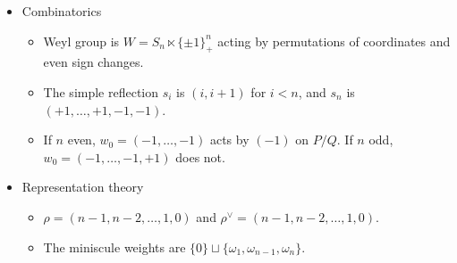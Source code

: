 \documentclass{article}
\begin{document}
\begin{itemize}
\begin{itemize}
		\item The simple roots are $\{e_i-e_{i+1}:i\}\cup\{e_{n-1}+e_n\}$. Set $\alpha_i\coloneqq e_i-e_{i+1}$ and $\alpha_n\coloneqq e_{n-1}+e_n$.
		\item Dynkin diagram:
		\[\begin{tikzcd}[cramped, row sep=tiny]
			&&&& {\alpha_{n-1}} \\
			{\alpha_1} & {\alpha_2} & \cdots & {\alpha_{n-2}} \\
			&&&& {\alpha_n}
			\arrow[no head, from=2-1, to=2-2]
			\arrow[no head, from=2-2, to=2-3]
			\arrow[no head, from=2-3, to=2-4]
			\arrow[no head, from=2-4, to=1-5]
			\arrow[no head, from=2-4, to=3-5]
		\end{tikzcd}\]
		\item The fundamental weights are $\{\omega_i\}_i$ where $\omega_i\coloneqq({1,\ldots,1},0,\ldots,0)$ has $i$ ones for $i<n-1$ and $\omega_{n-1}\coloneqq\frac12(1,\ldots,1,-1)$ and $\omega_n\coloneqq\frac12(1,\ldots,1)$.
		\item Maximal root $\theta=e_1+e_2$.
	\end{itemize}
	\item Combinatorics
	\begin{itemize}
		\item Weyl group is $W=S_{n}\ltimes\{\pm1\}_+^n$ acting by permutations of coordinates and even sign changes.
		\item The simple reflection $s_i$ is $(i,i+1)$ for $i<n$, and $s_n$ is $(+1,\ldots,+1,-1,-1)$.
		\item If $n$ even, $w_0=(-1,\ldots,-1)$ acts by $(-1)$ on $P/Q$. If $n$ odd, $w_0=(-1,\ldots,-1,+1)$ does not.
	\end{itemize}
	\item Representation theory
	\begin{itemize}
		\item $\rho=(n-1,n-2,\ldots,1,0)$ and $\rho^\lor=(n-1,n-2,\ldots,1,0)$.
		\item The miniscule weights are $\{0\}\sqcup\{\omega_1,\omega_{n-1},\omega_n\}$.

\end{itemize}
\end{itemize}
\end{document}
